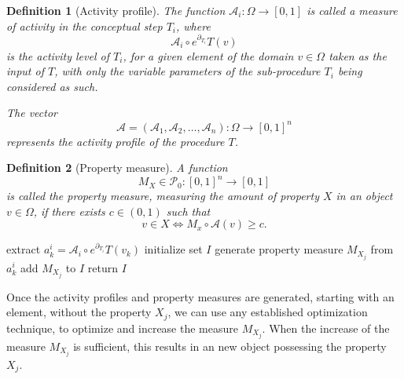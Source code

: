 \documentclass[smallcondensed]{svjour3}
\newcommand{\dP}{\mathcal{P}}
\newcommand{\D}{\partial}
\newtheorem{definicija}{Definition}[section]
\begin{document}
   
   \begin{definicija}[Activity profile]
   The function $\mathcal{A}_i:\Omega\to[0,1]$ is called a \emph{measure of activity} in the conceptual step $T_i$, where 
   $$\mathcal{A}_i\circ e^{\D_{T_i}}T(v)$$ 
   is the \emph{activity level} of $T_i$, for a given element of the domain $v\in \Omega$ taken as the input of $T$, with only the variable parameters of the sub-procedure $T_i$ being considered as such.
   
   The vector $$\mathcal{A}=(\mathcal{A}_1,\mathcal{A}_2,\dots,\mathcal{A}_n):\Omega\to[0,1]^n$$ represents the activity profile of the procedure $T$. 
   \end{definicija}
   
   
   \begin{definicija}[Property measure]
    A function 
    $$M_X\in\dP_0:[0,1]^n\to[0,1]$$  
    is called the property measure, measuring the amount of property $X$ in an object $v\in\Omega$, if there exists  $c\in(0,1)$ such that 
    $$v\in X\iff M_x\circ\mathcal{A}(v)\ge c.$$
    \end{definicija}
   \vspace{-1cm}
   \begin{algorithm}[H]

     
   \caption{Construct property measure}
   \label{alg:propertyMeasure}
   \begin{algorithmic}[1]
   \State extract $a^i_k=\mathcal{A}_i\circ e^{\D_{T_i}}T(v_k)$
	\EndFor
	\EndFor
	\State initialize set $I$
   \State generate property measure $M_{X_j}$ from $a^i_k$
   \State add $M_{X_j}$ to $I$
   \EndFor
   \State return $I$
   \EndProcedure
   \end{algorithmic}
   \end{algorithm}
   
   Once the activity profiles and property measures are generated, starting with an element, without the property $X_j$, we can use any established optimization technique, to optimize and increase the measure $M_{X_j}$. When the increase of the measure $M_{X_j}$ is sufficient, this results in an new object possessing the property $X_j$.
   
\end{document}
